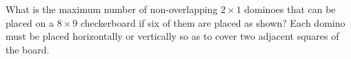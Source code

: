 What is the maximum number of non-overlapping $ 2\times 1$ dominoes that can be placed on a $ 8\times 9$ checkerboard if six of them are placed as shown? Each domino must be placed horizontally or vertically so as to cover two adjacent squares of the board.